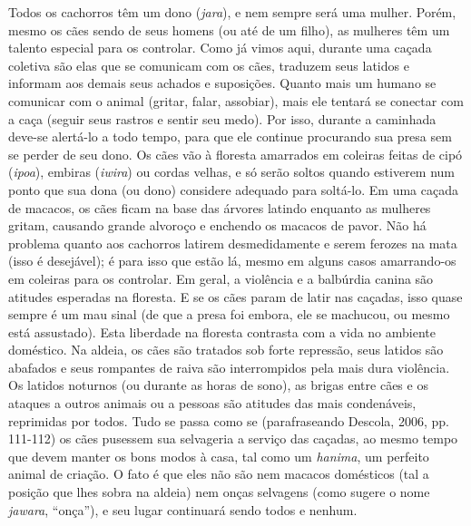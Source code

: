 Todos os cachorros têm um dono (\emph{jara}), e nem sempre será uma
mulher. Porém, mesmo os cães sendo de seus homens (ou até de um filho),
as mulheres têm um talento especial para os controlar. Como já vimos
aqui, durante uma caçada coletiva são elas que se comunicam com os cães,
traduzem seus latidos e informam aos demais seus achados e suposições.
Quanto mais um humano se comunicar com o animal (gritar, falar,
assobiar), mais ele tentará se conectar com a caça (seguir seus rastros
e sentir seu medo). Por isso, durante a caminhada deve-se alertá-lo a
todo tempo, para que ele continue procurando sua presa sem se perder de
seu dono. Os cães vão à floresta amarrados em coleiras feitas de cipó
(\emph{ipoa}), embiras (\emph{iwira}) ou cordas velhas, e só serão
soltos quando estiverem num ponto que sua dona (ou dono) considere
adequado para soltá-lo. Em uma caçada de macacos, os cães ficam na base
das árvores latindo enquanto as mulheres gritam, causando grande
alvoroço e enchendo os macacos de pavor. Não há problema quanto aos
cachorros latirem desmedidamente e serem ferozes na mata (isso é
desejável); é para isso que estão lá, mesmo em alguns casos amarrando-os
em coleiras para os controlar. Em geral, a violência e a balbúrdia
canina são atitudes esperadas na floresta. E se os cães param de latir
nas caçadas, isso quase sempre é um mau sinal (de que a presa foi
embora, ele se machucou, ou mesmo está assustado). Esta liberdade na
floresta contrasta com a vida no ambiente doméstico. Na aldeia, os cães
são tratados sob forte repressão, seus latidos são abafados e seus
rompantes de raiva são interrompidos pela mais dura violência. Os
latidos noturnos (ou durante as horas de sono), as brigas entre cães e
os ataques a outros animais ou a pessoas são atitudes das mais
condenáveis, reprimidas por todos. Tudo se passa como se (parafraseando
Descola, 2006, pp. 111-112) os cães pusessem sua selvageria a serviço
das caçadas, ao mesmo tempo que devem manter os bons modos à casa, tal
como um \emph{hanima}, um perfeito animal de criação. O fato é que eles
não são nem macacos domésticos (tal a posição que lhes sobra na aldeia)
nem onças selvagens (como sugere o nome \emph{jawara}, ``onça''), e seu
lugar continuará sendo todos e nenhum.

